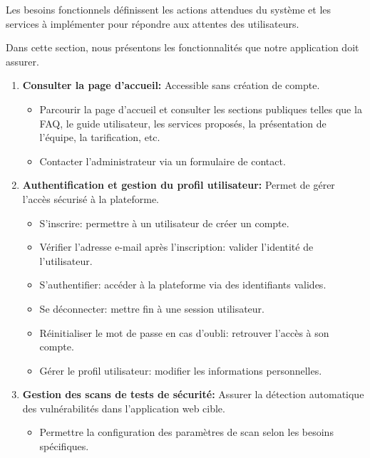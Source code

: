 \begin{justify}
    Les besoins fonctionnels définissent les actions attendues du système et les services à implémenter pour répondre aux attentes des utilisateurs\cite{bf}.
    
    Dans cette section, nous présentons les fonctionnalités que notre application doit assurer.
    \begin{enumerate}[left=-0.01cm]
        \item \textbf{Consulter la page d’accueil:} Accessible sans création de compte.
        \begin{itemize}[label=$\bullet$, left=-0.05cm]
            \item Parcourir la page d’accueil et consulter les sections publiques telles que la FAQ, le guide utilisateur, les services proposés, la présentation de l’équipe, la tarification, etc.
            \item Contacter l’administrateur via un formulaire de contact.
        \end{itemize}
        \item \textbf{Authentification et gestion du profil utilisateur:} Permet de gérer l’accès sécurisé à la plateforme.
            \begin{itemize}[label=$\bullet$, left=-0.05cm]
                \item S'inscrire: permettre à un utilisateur de créer un compte.
                \item Vérifier l’adresse e-mail après l’inscription: valider l'identité de l'utilisateur.
                \item S’authentifier: accéder à la plateforme via des identifiants valides.
                \item Se déconnecter: mettre fin à une session utilisateur.
                \item Réinitialiser le mot de passe en cas d’oubli: retrouver l'accès à son compte.
                \item Gérer le profil utilisateur: modifier les informations personnelles.
            \end{itemize}
        \item \textbf{Gestion des scans de tests de sécurité:} Assurer la détection automatique des vulnérabilités dans l’application web cible.
            \begin{itemize}[label=$\bullet$, left=-0.05cm]    
                \item Permettre la configuration des paramètres de scan selon les besoins spécifiques.

\end{itemize}
\end{enumerate}
\end{justify}
